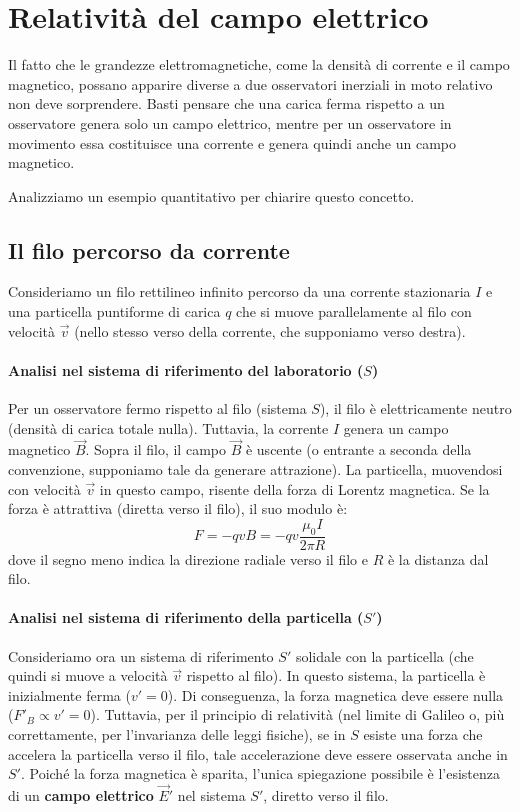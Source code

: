 \documentclass{book}
\begin{document}
\section{Relatività del campo elettrico}
Il fatto che le grandezze elettromagnetiche, come la densità di corrente e il campo magnetico, possano apparire diverse a due osservatori inerziali in moto relativo non deve sorprendere. Basti pensare che una carica ferma rispetto a un osservatore genera solo un campo elettrico, mentre per un osservatore in movimento essa costituisce una corrente e genera quindi anche un campo magnetico.

Analizziamo un esempio quantitativo per chiarire questo concetto.

\subsection*{Il filo percorso da corrente}
Consideriamo un filo rettilineo infinito percorso da una corrente stazionaria $I$ e una particella puntiforme di carica $q$ che si muove parallelamente al filo con velocità $\vec{v}$ (nello stesso verso della corrente, che supponiamo verso destra).

\paragraph{Analisi nel sistema di riferimento del laboratorio ($S$)}
Per un osservatore fermo rispetto al filo (sistema $S$), il filo è elettricamente neutro (densità di carica totale nulla). Tuttavia, la corrente $I$ genera un campo magnetico $\vec{B}$.
Sopra il filo, il campo $\vec{B}$ è uscente (o entrante a seconda della convenzione, supponiamo tale da generare attrazione). La particella, muovendosi con velocità $\vec{v}$ in questo campo, risente della forza di Lorentz magnetica. Se la forza è attrattiva (diretta verso il filo), il suo modulo è:
$$F = -qvB = -qv\frac{\mu_0I}{2\pi R}$$
dove il segno meno indica la direzione radiale verso il filo e $R$ è la distanza dal filo.

\paragraph{Analisi nel sistema di riferimento della particella ($S'$)}
Consideriamo ora un sistema di riferimento $S'$ solidale con la particella (che quindi si muove a velocità $\vec{v}$ rispetto al filo).
In questo sistema, la particella è inizialmente ferma ($v'=0$). Di conseguenza, la forza magnetica deve essere nulla ($F'_B \propto v' = 0$).
Tuttavia, per il principio di relatività (nel limite di Galileo o, più correttamente, per l'invarianza delle leggi fisiche), se in $S$ esiste una forza che accelera la particella verso il filo, tale accelerazione deve essere osservata anche in $S'$. Poiché la forza magnetica è sparita, l'unica spiegazione possibile è l'esistenza di un \textbf{campo elettrico} $\vec{E}'$ nel sistema $S'$, diretto verso il filo.
\end{document}
